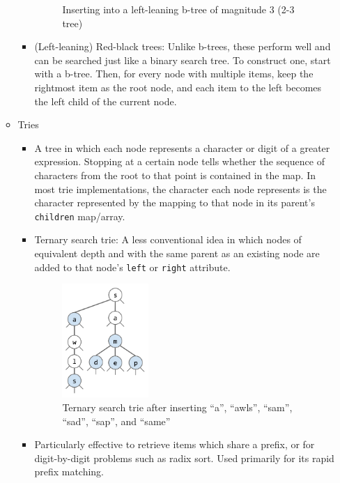 \documentclass{article}
\begin{document}
\begin{itemize}
\begin{itemize}
\begin{itemize}
\begin{figure}[h]
                \caption{Inserting into a left-leaning b-tree of magnitude 3 (2-3 tree)}
                \label{fig:my_label}
            \end{figure}
            \item (Left-leaning) Red-black trees: Unlike b-trees, these perform well and can be searched just like a binary search tree. To construct one, start with a b-tree. Then, for every node with multiple items, keep the rightmost item as the root node, and each item to the left becomes the left child of the current node.
        \end{itemize}
        \item Tries
        \begin{itemize}
            \item A tree in which each node represents a character or digit of a greater expression. Stopping at a certain node tells whether the sequence of characters from the root to that point is contained in the map. In most trie implementations, the character each node represents is the character represented by the mapping to that node in its parent's \texttt{children} map/array.
            \item Ternary search trie: A less conventional idea in which nodes of equivalent depth and with the same parent as an existing node are added to that node's \texttt{left} or \texttt{right} attribute.
            \begin{figure}[h]
                \centering
                \includegraphics[width=0.35\textwidth]{images/TernarySearchTrie.png}
                \caption{Ternary search trie after inserting ``a'', ``awls'', ``sam'', ``sad'', ``sap'', and ``same''}
                \label{fig:my_label}
            \end{figure}
            \item Particularly effective to retrieve items which share a prefix, or for digit-by-digit problems such as radix sort. Used primarily for its rapid prefix matching.

\end{itemize}
\end{itemize}
\end{itemize}
\end{document}
